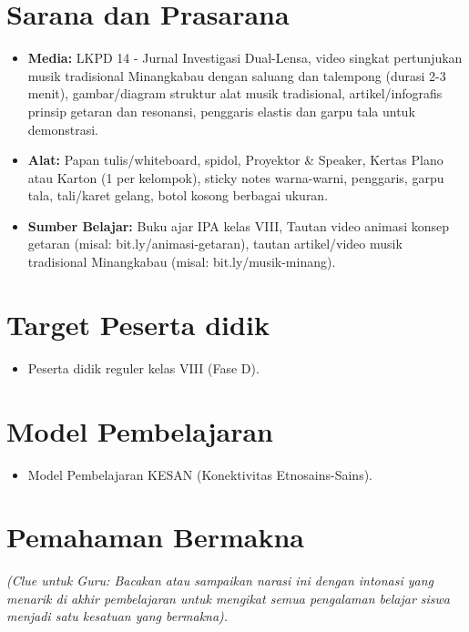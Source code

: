 \documentclass[12pt,a4paper]{article}
\begin{document}
\section{Sarana dan Prasarana}

\begin{itemize}
\item \textbf{Media:} LKPD 14 - Jurnal Investigasi Dual-Lensa, video singkat pertunjukan musik tradisional Minangkabau dengan saluang dan talempong (durasi 2-3 menit), gambar/diagram struktur alat musik tradisional, artikel/infografis prinsip getaran dan resonansi, penggaris elastis dan garpu tala untuk demonstrasi.
\item \textbf{Alat:} Papan tulis/whiteboard, spidol, Proyektor \& Speaker, Kertas Plano atau Karton (1 per kelompok), sticky notes warna-warni, penggaris, garpu tala, tali/karet gelang, botol kosong berbagai ukuran.
\item \textbf{Sumber Belajar:} Buku ajar IPA kelas VIII, Tautan video animasi konsep getaran (misal: bit.ly/animasi-getaran), tautan artikel/video musik tradisional Minangkabau (misal: bit.ly/musik-minang).
\end{itemize}

\section{Target Peserta didik}

\begin{itemize}
\item Peserta didik reguler kelas VIII (Fase D).
\end{itemize}

\section{Model Pembelajaran}

\begin{itemize}
\item Model Pembelajaran KESAN (Konektivitas Etnosains-Sains).
\end{itemize}

\section{Pemahaman Bermakna}
\textit{(Clue untuk Guru: Bacakan atau sampaikan narasi ini dengan intonasi yang menarik di akhir pembelajaran untuk mengikat semua pengalaman belajar siswa menjadi satu kesatuan yang bermakna).}
\end{document}
